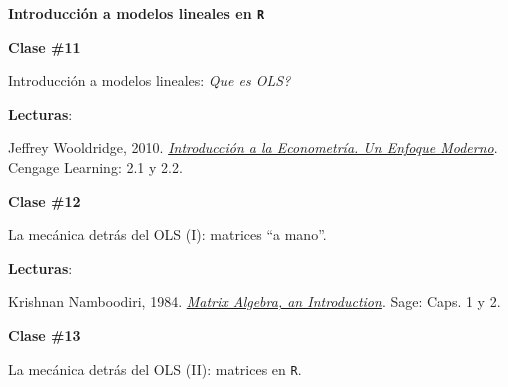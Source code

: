 \documentclass[letterpaper]{article}
\renewenvironment{itemize}{
  \begin{list}{}{
    \setlength{\leftmargin}{1.5em}
  }
}{
  \end{list}
}
\begin{document}
\begin{enumerate}
	\item {\bf Introducci\'on a modelos lineales en \texttt{R}}


			\begin{itemize} 
				\item[$\bullet$] {\bf Clase \#11}
					\begin{itemize} 
						\item[$\circ$] Introducci\'on a modelos lineales: \emph{Que es OLS?}
						\item[$\circ$] {\bf Lecturas}: 
							\begin{itemize}
								\item[$\diamond$] Jeffrey Wooldridge, 2010. \href{https://github.com/hbahamonde/Metodos_Cuanti_I/raw/master/Readings/Wooldridge.pdf}{\emph{Introducci\'on a la Econometr\'ia. Un Enfoque Moderno}}. Cengage Learning: 2.1 y 2.2.
							\end{itemize}
					\end{itemize}
			\end{itemize}



			\begin{itemize} 
				\item[$\bullet$] {\bf Clase \#12}
					\begin{itemize} 
						\item[$\circ$] La mec\'anica detr\'as del OLS (I): matrices ``a mano''.
						\item[$\circ$] {\bf Lecturas}: 
							\begin{itemize}
								\item[$\diamond$] Krishnan Namboodiri, 1984. \href{https://github.com/hbahamonde/Metodos_Cuanti_I/raw/master/Readings/Namboodiri.pdf}{\emph{Matrix Algebra, an Introduction}}. Sage: Caps. 1 y 2.
							\end{itemize}
					\end{itemize}
			\end{itemize}

			\begin{itemize} 
				\item[$\bullet$] {\bf Clase \#13}
					\begin{itemize} 
						\item[$\circ$] La mec\'anica detr\'as del OLS (II): matrices en \texttt{R}.
					\end{itemize}
			\end{itemize}




\end{enumerate}
\end{document}
